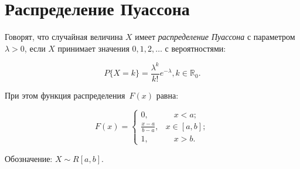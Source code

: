 \chapter{Распределение Пуассона}

Говорят, что случайная величина $X$ имеет \textit{распределение Пуассона} с параметром $\lambda > 0$, если $X$ принимает значения $0, 1, 2, \dots$ с вероятностями:

\begin{equation}
	P\{X=k\} = \frac{\lambda^k}{k!} e^{-\lambda}, k \in \mathbb{R}_0.
\end{equation}

При этом функция распределения~$F(x)$ равна:

\begin{equation}
	F(x) =
	\begin{cases}
		0,  & \quad x < a;\\
		\displaystyle\frac{x - a}{b - a}, & x \in [a, b];\\
		1,  & \quad x > b.
	\end{cases}
\end{equation}

Обозначение: $X \sim R[a, b]$.
